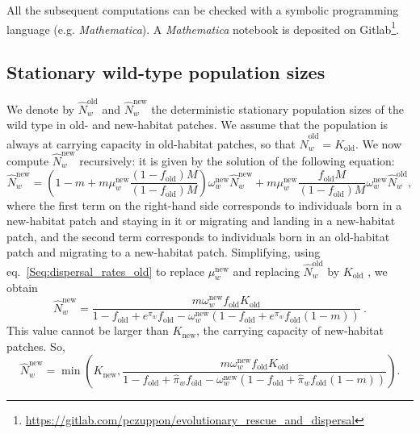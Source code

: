 \documentclass[11pt]{article}
\begin{document}
All the subsequent computations can be checked with a symbolic programming language (e.g. \textit{Mathematica}). A \textit{Mathematica} notebook is deposited on Gitlab\footnote{\url{https://gitlab.com/pczuppon/evolutionary\_rescue\_and\_dispersal}}.

\subsection*{Stationary wild-type population sizes}
We denote by $\widehat{N}_w^{\text{old}}$ and $\widehat{N}_w^{\text{new}}$ the deterministic stationary population sizes of the wild type in old- and new-habitat patches. We assume that the population is always at carrying capacity in old-habitat patches, so that $\widehat{N}_w^{\text{old}} = K_{\text{old}}$. We now compute $\widehat{N}_w^{\text{new}}$ recursively: it is given by the solution of the following equation: 
%
\begin{equation}\label{Seq:wt_deme2}
\widehat{N}_w^{\text{new}} = \left(1-m + m \mu_w^{\text{new}}  \frac{(1-f_{\text{old}})M}{(1-f_{\text{old}})M}\right)  \omega_w^{\text{new}}  \widehat{N}_w^{\text{new}}   + m \mu_w^{\text{new}} \frac{f_{\text{old}} M}{(1-f_{\text{old}})M} \omega_w^{\text{new}}  \widehat{N}_w^{\text{old}}, \nonumber 
\end{equation}
where the first term on the right-hand side corresponds to individuals born in a new-habitat patch and staying in it or migrating and landing in a new-habitat patch, and the second term corresponds to individuals born in an old-habitat patch and migrating to a new-habitat patch. Simplifying, using eq.~\eqref{Seq:dispersal_rates_old} to replace $\mu_w^{\text{new}} $ and replacing $\widehat{N}_w^{\text{old}}$ by $K_{\text{old}}$ , we obtain
%
\begin{equation}
\widehat{N}_w^{\text{new}} = \frac{m \omega_w^{\text{new}} f_{\text{old}}  K_{\text{old}}}{
1-f_{\text{old}} + e^{\pi_w} f_{\text{old}} - \omega_w^{\text{new}} (1-f_{\text{old}} + e^{\pi_w} f_{\text{old}} (1-m))
}
\ .
\end{equation}
%
This value cannot be larger than $K_{\text{new}}$, the carrying capacity of new-habitat patches. So, 
\begin{equation}\label{Seq:Nhatnew}
\widehat{N}_w^{\text{new}} = \min\left(K_{\text{new}},  \frac{m \omega_w^{\text{new}} f_{\text{old}}  K_{\text{old}}}{
	1-f_{\text{old}} + \widehat{\pi}_w f_{\text{old}} - \omega_w^{\text{new}} (1-f_{\text{old}} + \widehat{\pi}_w f_{\text{old}} (1-m))
} \right).
\end{equation} 
\end{document}
